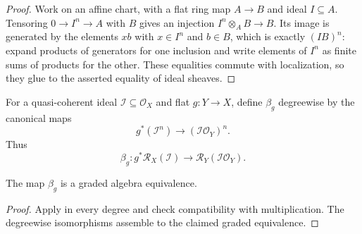\begin{proof}
  Work on an affine chart, with a flat ring map $A\to B$ and ideal $I\subseteq
  A$.  Tensoring $0\to I^n\to A$ with $B$ gives an injection
  $I^n\otimes_AB\to B$.  Its image is generated by the elements $xb$ with
  $x\in I^n$ and $b\in B$, which is exactly $(IB)^n$: expand products of
  generators for one inclusion and write elements of $I^n$ as finite sums of
  products for the other.  These equalities commute with localization, so
  they glue to the asserted equality of ideal sheaves.
\end{proof}

\begin{definition}
  \label{def:nagata-flat-pullback-rees-map}

  For a quasi-coherent ideal $\mathcal I\subseteq\mathcal O_X$ and flat
  $g\colon Y\to X$, define $\beta_g$ degreewise by the canonical
  maps
  \[
    g^*(\mathcal I^n)\longrightarrow
      (\mathcal I\mathcal O_Y)^n.
  \]
  Thus
  \[
    \beta_g\colon g^*\mathcal R_X(\mathcal I)\longrightarrow
      \mathcal R_Y(\mathcal I\mathcal O_Y).
  \]
\end{definition}

\begin{lemma}
  \label{lemma:nagata-flat-pullback-rees}

  The map $\beta_g$ is a graded algebra equivalence.
\end{lemma}

\begin{proof}
  Apply  in every degree and check
  compatibility with multiplication.  The degreewise isomorphisms assemble
  to the claimed graded equivalence.
\end{proof}


